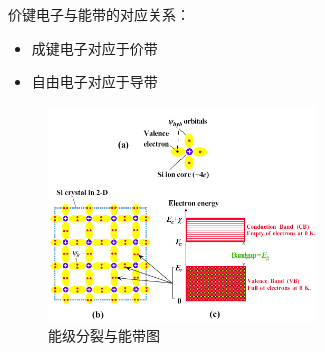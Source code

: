 \documentclass[trans]{beamer} %
\begin{document}
\begin{frame}{价键电子与能带的对应关系：}

    \begin{itemize}
        \item 成键电子对应于价带
        \item 自由电子对应于导带
    \end{itemize}
    \begin{figure}[htbp] 
    \centering\includegraphics[height=2.25in]{source/ch2/fg214.png} 
    \caption{能级分裂与能带图}
    \end{figure}  
   
 
 \end{frame}
\end{document}
